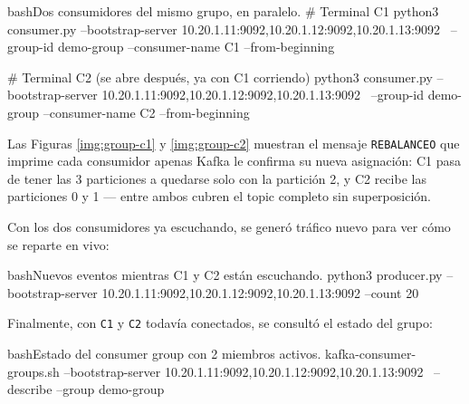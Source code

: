 		\begin{sourcecode}[\label{codigo-c1-c2}]{bash}{Dos consumidores del mismo grupo, en paralelo.}
# Terminal C1
python3 consumer.py --bootstrap-server 10.20.1.11:9092,10.20.1.12:9092,10.20.1.13:9092 \
    --group-id demo-group --consumer-name C1 --from-beginning

# Terminal C2 (se abre después, ya con C1 corriendo)
python3 consumer.py --bootstrap-server 10.20.1.11:9092,10.20.1.12:9092,10.20.1.13:9092 \
    --group-id demo-group --consumer-name C2 --from-beginning
		\end{sourcecode}


		\setindexcaption{Asignación de particiones en C2.}

		Las Figuras \ref{img:group-c1} y \ref{img:group-c2} muestran el mensaje \texttt{REBALANCEO} que imprime cada consumidor apenas Kafka le confirma su nueva asignación: C1 pasa de tener las 3 particiones a quedarse solo con la partición 2, y C2 recibe las particiones 0 y 1 — entre ambos cubren el topic completo sin superposición.

		Con los dos consumidores ya escuchando, se generó tráfico nuevo para ver cómo se reparte en vivo:

		\begin{sourcecode}[\label{codigo-producer-group-demo}]{bash}{Nuevos eventos mientras C1 y C2 están escuchando.}
python3 producer.py --bootstrap-server 10.20.1.11:9092,10.20.1.12:9092,10.20.1.13:9092 --count 20
		\end{sourcecode}


		Finalmente, con \texttt{C1} y \texttt{C2} todavía conectados, se consultó el estado del grupo:

		\begin{sourcecode}[\label{codigo-group-describe}]{bash}{Estado del consumer group con 2 miembros activos.}
kafka-consumer-groups.sh --bootstrap-server 10.20.1.11:9092,10.20.1.12:9092,10.20.1.13:9092 \
    --describe --group demo-group
		\end{sourcecode}

